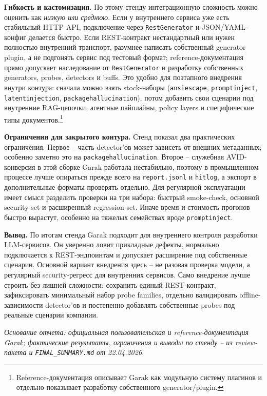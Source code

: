 \documentclass[11pt,a4paper]{article}
\begin{document}
\textbf{Гибкость и кастомизация.} По этому стенду интеграционную сложность можно оценить как \emph{низкую или среднюю}. Если у внутреннего сервиса уже есть стабильный HTTP API, подключение через \texttt{RestGenerator} и JSON/YAML-конфиг делается быстро. Если REST-контракт нестандартный или нужен полностью внутренний транспорт, разумнее написать собственный generator plugin, а не подгонять сервис под тестовый формат; reference-документация прямо допускает наследование от \texttt{RestGenerator} и разработку собственных generators, probes, detectors и buffs. Это удобно для поэтапного внедрения внутри контура: сначала можно взять stock-наборы (\texttt{ansiescape}, \texttt{promptinject}, \texttt{latentinjection}, \texttt{packagehallucination}), потом добавить свои сценарии под внутренние RAG-цепочки, агентные пайплайны, policy layers и специфические типы документов.\footnote{Reference-документация описывает Garak как модульную систему плагинов и отдельно показывает разработку собственного generator/plugin.}

\textbf{Ограничения для закрытого контура.} Стенд показал два практических ограничения. Первое -- часть detector'ов может зависеть от внешних метаданных; особенно заметно это на \texttt{packagehallucination}. Второе -- служебная AVID-конверсия в этой сборке Garak работала нестабильно, поэтому в промышленном процессе лучше опираться прежде всего на \texttt{report.jsonl} и \texttt{hitlog}, а экспорт в дополнительные форматы проверять отдельно. Для регулярной эксплуатации имеет смысл разделить проверки на три набора: быстрый smoke-check, основной security-set и расширенный regression-set. Иначе время и стоимость прогонов быстро вырастут, особенно на тяжелых семействах вроде \texttt{promptinject}.

\textbf{Вывод.} По итогам стенда Garak подходит для внутреннего контроля разработки LLM-сервисов. Он уверенно ловит прикладные дефекты, нормально подключается к REST-эндпоинтам и допускает расширение под собственные сценарии. Основной вариант внедрения здесь -- не разовая проверка модели, а регулярный security-регресс для внутренних сервисов. Само внедрение лучше строить без лишней сложности: сохранить единый REST-контракт, зафиксировать минимальный набор probe families, отдельно валидировать offline-зависимости detector'ов и постепенно добавлять собственные probes под реальные сценарии компании.

\vspace{0.3em}
{\footnotesize\textit{Основание отчета: официальная пользовательская и reference-документация Garak; фактические результаты, ограничения и выводы по стенду -- из review-пакета и \texttt{FINAL\_SUMMARY.md} от 22.04.2026.}}
\end{document}
